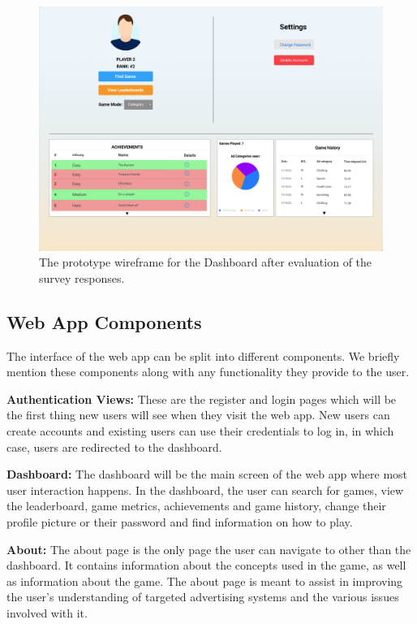 \documentclass{l4proj}
\begin{document}
\begin{figure}
    \centering
    \includegraphics[width=1\linewidth]{images/DashboardFinal.png}    

    \caption{The prototype wireframe for the Dashboard after evaluation of the survey responses. }

    \label{fig:finaldesign} 
\end{figure}

\subsection{Web App Components}
The interface of the web app can be split into different components. We briefly mention these components along with any functionality they provide to the user.

\textbf{Authentication Views:} These are the register and login pages which will be the first thing new users will see when they visit the web app. New users can create accounts and existing users can use their credentials to log in, in which case, users are redirected to the dashboard.

\textbf{Dashboard:} The dashboard will be the main screen of the web app where most user interaction happens. In the dashboard, the user can search for games, view the leaderboard, game metrics, achievements and game history, change their profile picture or their password and find information on how to play.

\textbf{About:} The about page is the only page the user can navigate to other than the dashboard. It contains information about the concepts used in the game, as well as information about the game. The about page is meant to assist in improving the user's understanding of targeted advertising systems and the various issues involved with it. 
\end{document}
